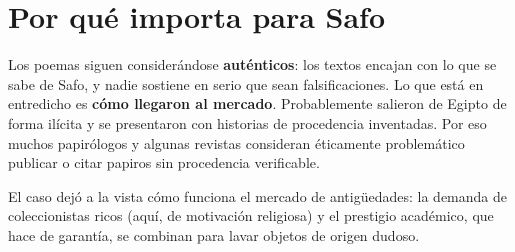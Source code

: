 \documentclass[11pt,a4paper]{article}
\begin{document}
\section*{Por qué importa para Safo}

Los poemas siguen considerándose \textbf{auténticos}: los textos encajan con lo que se sabe de Safo, y nadie sostiene en serio que sean falsificaciones. Lo que está en entredicho es \textbf{cómo llegaron al mercado}. Probablemente salieron de Egipto de forma ilícita y se presentaron con historias de procedencia inventadas. Por eso muchos papirólogos y algunas revistas consideran éticamente problemático publicar o citar papiros sin procedencia verificable.

El caso dejó a la vista cómo funciona el mercado de antigüedades: la demanda de coleccionistas ricos (aquí, de motivación religiosa) y el prestigio académico, que hace de garantía, se combinan para lavar objetos de origen dudoso.
\end{document}
